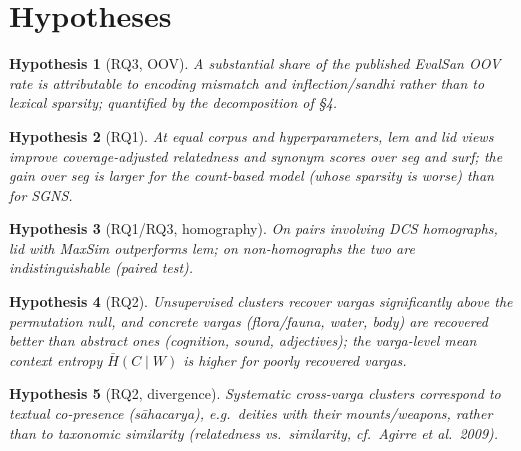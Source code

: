 \documentclass[11pt,a4paper]{article}
\newtheorem{hypothesis}{Hypothesis}
\theoremstyle{remark}\newtheorem{remark}{Remark}
\newcommand{\vk}[1]{\textsf{#1}}         %
\begin{document}
\section{Hypotheses}
\begin{hypothesis}[RQ3, OOV]\label{h:oov}
A substantial share of the published EvalSan OOV rate is attributable to
encoding mismatch and inflection/sandhi rather than to lexical sparsity;
quantified by the decomposition of \S4.
\end{hypothesis}
\begin{hypothesis}[RQ1]
At equal corpus and hyperparameters, \vk{lem} and \vk{lid} views improve
coverage-adjusted relatedness and synonym scores over \vk{seg} and
\vk{surf}; the gain over \vk{seg} is larger for the count-based model (whose
sparsity is worse) than for SGNS.
\end{hypothesis}
\begin{hypothesis}[RQ1/RQ3, homography]
On pairs involving DCS homographs, \vk{lid} with MaxSim outperforms \vk{lem};
on non-homographs the two are indistinguishable (paired test).
\end{hypothesis}
\begin{hypothesis}[RQ2]
Unsupervised clusters recover vargas significantly above the permutation
null, and concrete vargas (flora/fauna, water, body) are recovered better than
abstract ones (cognition, sound, adjectives); the varga-level mean context
entropy $\bar H(C\mid W)$ is higher for poorly recovered vargas.
\end{hypothesis}
\begin{hypothesis}[RQ2, divergence]
Systematic cross-varga clusters correspond to textual co-presence
(\emph{sāhacarya}), e.g.\ deities with their mounts/weapons, rather than to
taxonomic similarity (relatedness vs.\ similarity, cf.\ Agirre et al.\ 2009).
\end{hypothesis}

\end{document}
